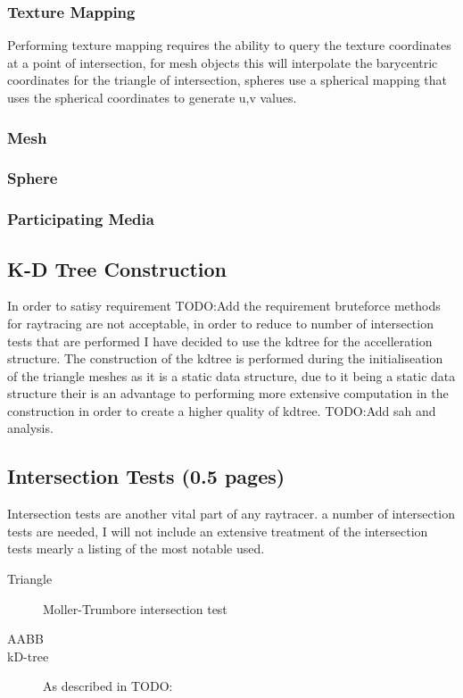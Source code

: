 \subsubsection{Texture Mapping}
Performing texture mapping requires the ability to query the texture coordinates at a point of intersection, for mesh objects this
will interpolate the barycentric coordinates for the triangle of intersection, spheres use a spherical mapping that uses the
spherical coordinates to generate u,v values.

\subsubsection{Mesh}
\subsubsection{Sphere}
\subsubsection{Participating Media}

\subsection{K-D Tree Construction}
In order to satisy requirement TODO:Add the requirement bruteforce methods for raytracing are not acceptable, in order to reduce
to number of intersection tests that are performed I have decided to use the kdtree for the accelleration structure. The
construction of the kdtree is performed during the initialiseation of the triangle meshes as it is a static data structure, due
to it being a static data structure their is an advantage to performing more extensive computation in the construction in
order to create a higher quality of kdtree. TODO:Add sah and analysis.

\subsection{Intersection Tests (0.5 pages)}
Intersection tests are another vital part of any raytracer. a number of intersection tests are needed, I will not include
an extensive treatment of the intersection tests mearly a listing of the most notable used.

\begin{description}
\item[Triangle] Moller-Trumbore intersection test \cite{MolTru97}
\item[AABB]
\item[kD-tree] As described in TODO:
\end{description}

